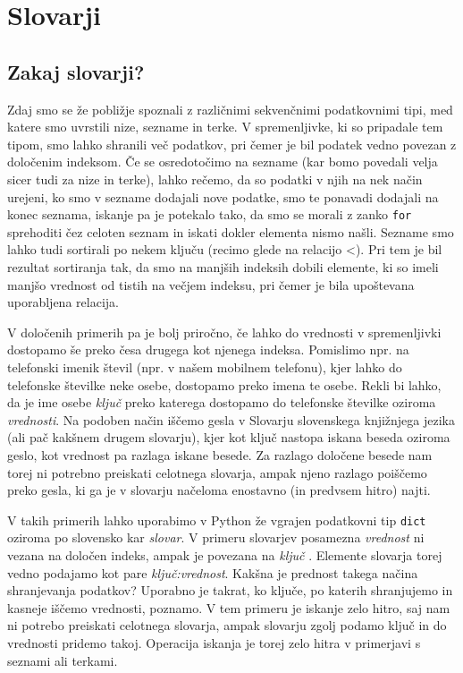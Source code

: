 \chapter{Slovarji}

\section{Zakaj slovarji?}

Zdaj smo se že pobližje spoznali z različnimi sekvenčnimi podatkovnimi tipi, med katere smo uvrstili nize, sezname in terke. V spremenljivke, ki so pripadale tem tipom, smo lahko shranili več podatkov, pri čemer je bil podatek vedno povezan z določenim indeksom. Če se osredotočimo na sezname (kar bomo povedali velja sicer tudi za nize in terke), lahko rečemo, da so podatki v njih na nek način urejeni, ko smo v sezname dodajali nove podatke, smo te ponavadi dodajali na konec seznama, iskanje pa je potekalo tako, da smo se morali z zanko \texttt{for} sprehoditi čez celoten seznam in iskati dokler elementa nismo našli. Sezname smo lahko tudi sortirali po nekem ključu (recimo glede na relacijo <). Pri tem je bil rezultat sortiranja tak, da smo na manjših indeksih dobili elemente, ki so imeli manjšo vrednost od tistih na večjem indeksu, pri čemer je bila upoštevana uporabljena relacija. 

V določenih primerih pa je bolj priročno, če lahko do vrednosti v spremenljivki dostopamo še preko česa drugega kot njenega indeksa. Pomislimo npr. na telefonski imenik števil (npr. v našem mobilnem telefonu), kjer lahko do telefonske številke neke osebe, dostopamo preko imena te osebe. Rekli bi lahko, da je ime osebe \emph{ključ} preko katerega dostopamo do telefonske številke oziroma \emph{vrednosti}. Na podoben način iščemo gesla v Slovarju slovenskega knjižnjega jezika (ali pač kakšnem drugem slovarju), kjer kot ključ nastopa iskana beseda oziroma geslo, kot vrednost pa razlaga iskane besede. Za razlago določene besede nam torej ni potrebno preiskati celotnega slovarja, ampak njeno razlago poiščemo preko gesla, ki ga je v slovarju načeloma enostavno (in predvsem hitro) najti.

V takih primerih lahko uporabimo v Python že vgrajen podatkovni tip \texttt{dict}  oziroma po slovensko kar \emph{slovar}. V primeru slovarjev posamezna \emph{vrednost}  ni vezana na določen indeks, ampak je povezana na  \emph{ključ} . Elemente slovarja torej vedno podajamo kot pare \emph{ključ:vrednost}. Kakšna je prednost takega načina shranjevanja podatkov? Uporabno je takrat, ko ključe, po katerih shranjujemo in kasneje iščemo vrednosti, poznamo. V tem primeru je iskanje zelo hitro, saj nam ni potrebo preiskati celotnega slovarja, ampak slovarju zgolj podamo ključ in do vrednosti pridemo takoj. Operacija iskanja je torej zelo hitra v primerjavi s seznami ali terkami.

